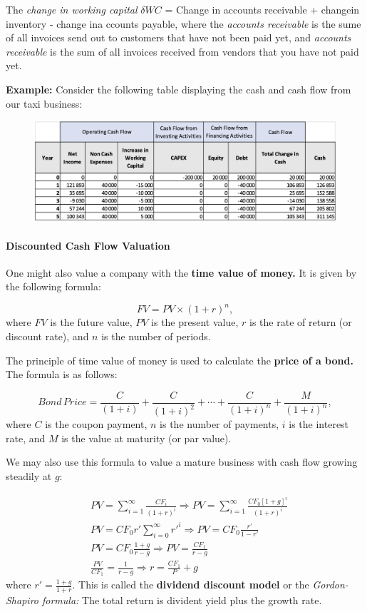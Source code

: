 \documentclass[a4paper]{extarticle}
\begin{document}
The \textit{change in working capital} \(\delta WC\) = Change in accounts receivable + changein inventory - change ina ccounts payable, where the \textit{accounts receivable} is the sume of all invoices send out to customers that have not been paid yet, and \textit{accounts receivable} is the sum of all invoices received from vendors that you have not paid yet.

\begin{ebox}
    \textbf{Example:} Consider the following table displaying the cash and cash flow from our taxi business:

    \begin{figure}[H]
        \includegraphics[width=15cm]{../images/EnpRisk_Fig4-1}
        \centering
    \end{figure}
\end{ebox}

\paragraph{Discounted Cash Flow Valuation} One might also value a company with the \textbf{time value of money.} It is given by the following formula:

\[
    FV = PV \times (1 + r)^n,
\]
where \(FV\) is the future value, \(PV\) is the present value, \(r\) is the rate of return (or discount rate), and \(n\) is the number of periods.

The principle of time value of money is used to calculate the \textbf{price of a bond.} The formula is as follows:

\[
    Bond \, Price = \frac{C}{(1 + i)} + \frac{C}{(1 + i)^2} + \cdots + \frac{C}{(1 + i)^n} + \frac{M}{(1 + i)^n},
\]
where \(C\) is the coupon payment, \(n\) is the number of payments, \(i\) is the interest rate, and \(M\) is the value at maturity (or par value).

We may also use this formula to value a mature business with cash flow growing steadily at \(g\):

\begin{align*}
    &PV = \sum_{i = 1}^{\infty} \frac{CF_i}{(1 + r)^i} \Rightarrow PV = \sum_{i = 1}^{\infty} \frac{CF_0[1 + g]^i}{(1 + r)^i} \\
    &PV = CF_0r' \sum_{i = 0}^{\infty} r'^i \Rightarrow PV = CF_0 \frac{r'}{1 - r'} \\
    &PV = CF_0 \frac{1 + g}{r - g} \Rightarrow PV = \frac{CF_1}{r - g} \\
    &\frac{PV}{CF_1} = \frac{1}{r - g} \Rightarrow r = \frac{CF_1}{P} + g
\end{align*}
where \(r' = \frac{1 + g}{1 + r}\). This is called the \textbf{dividend discount model} or the \textit{Gordon-Shapiro formula:} The total return is divident yield plus the growth rate.
\end{document}
